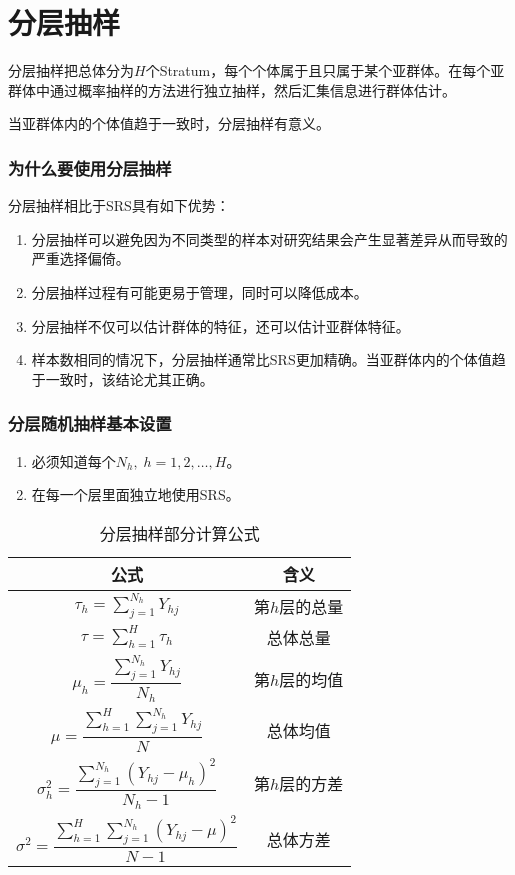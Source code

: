 \section{分层抽样}

\begin{definition}
	分层抽样把总体分为$H$个\gls{Stratum}，每个个体属于且只属于某个亚群体。在每个亚群体中通过概率抽样的方法进行独立抽样，然后汇集信息进行群体估计。
\end{definition}
当亚群体内的个体值趋于一致时，分层抽样有意义。

\subsubsection{为什么要使用分层抽样}
分层抽样相比于SRS具有如下优势：
\begin{enumerate}
	\item 分层抽样可以避免因为不同类型的样本对研究结果会产生显著差异从而导致的严重选择偏倚。
	\item 分层抽样过程有可能更易于管理，同时可以降低成本。
	\item 分层抽样不仅可以估计群体的特征，还可以估计亚群体特征。
	\item 样本数相同的情况下，分层抽样通常比SRS更加精确。当亚群体内的个体值趋于一致时，该结论尤其正确。
\end{enumerate}

\subsubsection{分层随机抽样基本设置}
\begin{enumerate}
	\item 必须知道每个$N_h,\;h=1,2,\dots,H$。
	\item 在每一个层里面独立地使用SRS。
\end{enumerate}

\begin{table}[h]
	\centering
	\setlength{\tabcolsep}{25pt} %
	\renewcommand{\arraystretch}{1.5}
	\begin{tabular}{cc}
		\toprule
		公式      & 含义 \\
		\midrule
		$\tau_h=\sum\limits_{j=1}^{N_h}Y_{hj}$ & 第$h$层的总量 \\
		$\tau=\sum\limits_{h=1}^H\tau_{h}$	& 总体总量 \\
		$\mu_h=\dfrac{\sum\limits_{j=1}^{N_h}Y_{hj}}{N_h}$                 
		& 第$h$层的均值 \\
		$\mu=\dfrac{\sum\limits_{h=1}^H\sum\limits_{j=1}^{N_h}Y_{hj}}{N}$           
		& 总体均值 \\
		$\sigma^2_h=\dfrac{\sum\limits_{j=1}^{N_h}\left(Y_{hj}-\mu_h\right)^2}{N_h-1}$                       & 第$h$层的方差 \\
		$\sigma^2=\dfrac{\sum\limits_{h=1}^H\sum\limits_{j=1}^{N_h}\left(Y_{hj}-\mu\right)^2}{N-1}$                 & 总体方差 \\
		\bottomrule
	\end{tabular}
	\caption{分层抽样部分计算公式}
\end{table}

